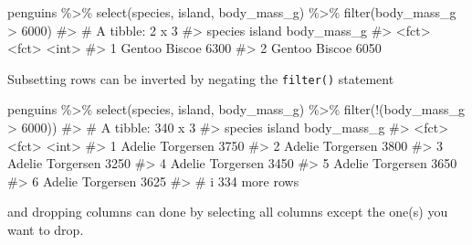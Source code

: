 \documentclass[
  letterpaper,
  DIV=11,
  numbers=noendperiod]{scrreprt}
\newenvironment{Shaded}{\begin{snugshade}}{\end{snugshade}}
\newcommand{\CommentTok}[1]{\textcolor[rgb]{0.37,0.37,0.37}{#1}}
\newcommand{\DecValTok}[1]{\textcolor[rgb]{0.68,0.00,0.00}{#1}}
\newcommand{\FunctionTok}[1]{\textcolor[rgb]{0.28,0.35,0.67}{#1}}
\newcommand{\NormalTok}[1]{\textcolor[rgb]{0.00,0.23,0.31}{#1}}
\newcommand{\SpecialCharTok}[1]{\textcolor[rgb]{0.37,0.37,0.37}{#1}}
\begin{document}
\begin{Shaded}
\begin{Highlighting}[]
\NormalTok{penguins }\SpecialCharTok{\%\textgreater{}\%} 
  \FunctionTok{select}\NormalTok{(species, island, body\_mass\_g) }\SpecialCharTok{\%\textgreater{}\%} 
  \FunctionTok{filter}\NormalTok{(body\_mass\_g }\SpecialCharTok{\textgreater{}} \DecValTok{6000}\NormalTok{)}
\CommentTok{\#\textgreater{} \# A tibble: 2 x 3}
\CommentTok{\#\textgreater{}   species island body\_mass\_g}
\CommentTok{\#\textgreater{}   \textless{}fct\textgreater{}   \textless{}fct\textgreater{}        \textless{}int\textgreater{}}
\CommentTok{\#\textgreater{} 1 Gentoo  Biscoe        6300}
\CommentTok{\#\textgreater{} 2 Gentoo  Biscoe        6050}
\end{Highlighting}
\end{Shaded}

Subsetting rows can be inverted by negating the \texttt{filter()}
statement

\begin{Shaded}
\begin{Highlighting}[]
\NormalTok{penguins }\SpecialCharTok{\%\textgreater{}\%} 
  \FunctionTok{select}\NormalTok{(species, island, body\_mass\_g) }\SpecialCharTok{\%\textgreater{}\%} 
  \FunctionTok{filter}\NormalTok{(}\SpecialCharTok{!}\NormalTok{(body\_mass\_g }\SpecialCharTok{\textgreater{}} \DecValTok{6000}\NormalTok{))}
\CommentTok{\#\textgreater{} \# A tibble: 340 x 3}
\CommentTok{\#\textgreater{}   species island    body\_mass\_g}
\CommentTok{\#\textgreater{}   \textless{}fct\textgreater{}   \textless{}fct\textgreater{}           \textless{}int\textgreater{}}
\CommentTok{\#\textgreater{} 1 Adelie  Torgersen        3750}
\CommentTok{\#\textgreater{} 2 Adelie  Torgersen        3800}
\CommentTok{\#\textgreater{} 3 Adelie  Torgersen        3250}
\CommentTok{\#\textgreater{} 4 Adelie  Torgersen        3450}
\CommentTok{\#\textgreater{} 5 Adelie  Torgersen        3650}
\CommentTok{\#\textgreater{} 6 Adelie  Torgersen        3625}
\CommentTok{\#\textgreater{} \# i 334 more rows}
\end{Highlighting}
\end{Shaded}

and dropping columns can done by selecting all columns except the one(s)
you want to drop.
\end{document}
